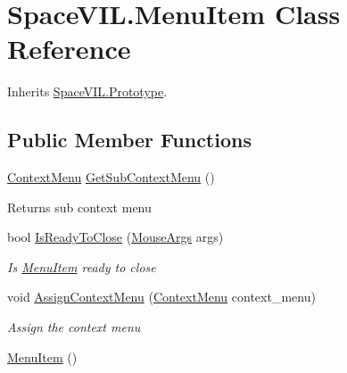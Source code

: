 \hypertarget{class_space_v_i_l_1_1_menu_item}{}\section{Space\+V\+I\+L.\+Menu\+Item Class Reference}
\label{class_space_v_i_l_1_1_menu_item}


Inherits \mbox{\hyperlink{class_space_v_i_l_1_1_prototype}{Space\+V\+I\+L.\+Prototype}}.

\subsection*{Public Member Functions}
\begin{DoxyCompactItemize}
\item 
\mbox{\label{class_space_v_i_l_1_1_menu_item_a4147be20a79641bd3c1e97e87af7b0bc}} 
\mbox{\hyperlink{class_space_v_i_l_1_1_context_menu}{Context\+Menu}} \mbox{\hyperlink{class_space_v_i_l_1_1_menu_item_a4147be20a79641bd3c1e97e87af7b0bc}{Get\+Sub\+Context\+Menu}} ()
\begin{DoxyCompactList}\small\item\em \begin{DoxyReturn}{Returns}
sub context menu 
\end{DoxyReturn}
\end{DoxyCompactList}\item 
bool \mbox{\hyperlink{class_space_v_i_l_1_1_menu_item_abf80ecab40a7c3d6bc655a70231ec5da}{Is\+Ready\+To\+Close}} (\mbox{\hyperlink{class_space_v_i_l_1_1_core_1_1_mouse_args}{Mouse\+Args}} args)
\begin{DoxyCompactList}\small\item\em Is \mbox{\hyperlink{class_space_v_i_l_1_1_menu_item}{Menu\+Item}} ready to close \end{DoxyCompactList}\item 
void \mbox{\hyperlink{class_space_v_i_l_1_1_menu_item_a1525b3cbf3eda9f35e9ad993326512be}{Assign\+Context\+Menu}} (\mbox{\hyperlink{class_space_v_i_l_1_1_context_menu}{Context\+Menu}} context\+\_\+menu)
\begin{DoxyCompactList}\small\item\em Assign the context menu \end{DoxyCompactList}\item 
\mbox{\hyperlink{class_space_v_i_l_1_1_menu_item_ac63df35b47cb47c446208e9024d070c8}{Menu\+Item}} ()

\end{DoxyCompactItemize}
